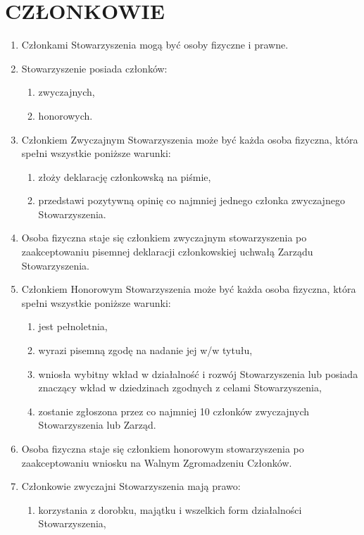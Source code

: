 \documentclass{article}
\begin{document}
\section{CZŁONKOWIE}
  \begin{enumerate}
    \item Członkami Stowarzyszenia mogą być osoby fizyczne i prawne.
    \item Stowarzyszenie posiada członków:
      \begin{enumerate}
        \item zwyczajnych,
        \item honorowych.
      \end{enumerate}
    \item Członkiem Zwyczajnym Stowarzyszenia może być każda osoba fizyczna, która spełni wszystkie poniższe warunki:
      \begin{enumerate}
        \item złoży deklarację członkowską na piśmie,
        \item przedstawi pozytywną opinię co najmniej jednego członka zwyczajnego Stowarzyszenia.
      \end{enumerate}
    \item Osoba fizyczna staje się członkiem zwyczajnym stowarzyszenia po zaakceptowaniu pisemnej deklaracji członkowskiej uchwałą Zarządu Stowarzyszenia.
    \item Członkiem Honorowym Stowarzyszenia może być każda osoba fizyczna, która spełni wszystkie poniższe warunki:
      \begin{enumerate}
        \item jest pełnoletnia,
        \item wyrazi pisemną zgodę na nadanie jej w/w tytułu,
        \item wniosła wybitny wkład w działalność i rozwój Stowarzyszenia lub posiada znaczący wkład w dziedzinach zgodnych z celami Stowarzyszenia,
        \item zostanie zgłoszona przez co najmniej 10 członków zwyczajnych Stowarzyszenia lub Zarząd.
      \end{enumerate}
    \item Osoba fizyczna staje się członkiem honorowym stowarzyszenia po zaakceptowaniu wniosku na Walnym Zgromadzeniu Członków.
    \item Członkowie zwyczajni Stowarzyszenia mają prawo:
      \begin{enumerate}
        \item korzystania z dorobku, majątku i wszelkich form działalności Stowarzyszenia,

\end{enumerate}
\end{enumerate}
\end{document}
